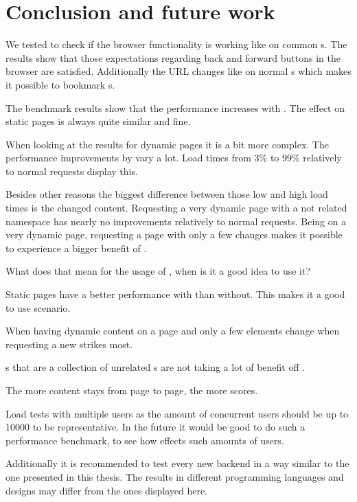 \section{Conclusion and future work}

We tested \lare{} to check if the browser functionality is working like on common \webApplication{}s.
The results show that those expectations regarding back and forward buttons in the browser are satisfied.
Additionally the URL changes like on normal \webApplication{}s which makes it possible to bookmark \webPage{}s.

The benchmark results show that the performance increases with \lare{}.
The effect on static pages is always quite similar and fine.

When looking at the results for dynamic pages it is a bit more complex.
The performance improvements by \lare{} vary a lot.
Load times from 3\% to 99\% relatively to normal requests display this.

Besides other reasons the biggest difference between those low and high load times is the changed content.
Requesting a very dynamic page with a not related namespace has nearly no improvements relatively to normal requests.
Being on a very dynamic page, requesting a page with only a few changes makes it possible to experience a bigger benefit of \lare{}.

What does that mean for the usage of \lare{}, when is it a good idea to use it?

Static pages have a better performance with \lare{} than without.
This makes it a good to use scenario.

When having dynamic content on a page and only a few elements change when requesting a new \webPage{} \lare{} strikes most.

\webSite{}s that are a collection of unrelated \webPage{}s are not taking a lot of benefit off \lare{}.

The more content stays from page to page, the more \lare{} scores.

Load tests with multiple users as the amount of concurrent users should be up to 10000 to be representative\cite{bib:bozdag_mesbah_vanDeursen08}.
In the future it would be good to do such a performance benchmark, to see how \lare{} effects such amounts of users.

Additionally it is recommended to test every new \lare{} backend in a way similar to the one presented in this thesis.
The results in different programming languages and \webApplication{} designs may differ from the ones displayed here.
